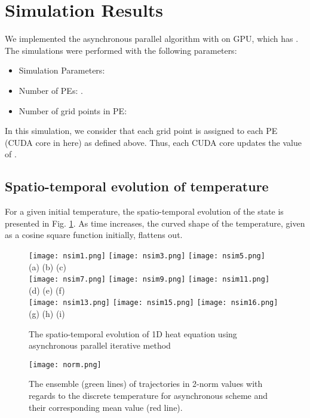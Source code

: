 \documentclass[1p]{elsarticle}
\begin{document}
\section{Simulation Results}
We implemented the asynchronous parallel algorithm with  on  GPU, which has  . 
The simulations were performed with the following parameters:
\begin{itemize}
\item{Simulation Parameters:}

\item{Number of PEs:} .
\item{Number of grid points in PE:} \\
\end{itemize}

In this simulation, we consider that each grid point is assigned to each PE (\textsf{CUDA} core in here) as defined  above. Thus, each \textsf{CUDA} core updates the value of .

\subsection{Spatio-temporal evolution of temperature}
For a given initial temperature, the spatio-temporal evolution of the state is presented in Fig. \ref{fig.2}. As time  increases, the curved shape of the temperature, given as a cosine square function initially, flattens out. 

\begin{figure}
\centering
\texttt{[image: nsim1.png]}
\texttt{[image: nsim3.png]}
\texttt{[image: nsim5.png]}\\
(a) \qquad\qquad\qquad\qquad\qquad\quad (b) \qquad\qquad\qquad\qquad\qquad\quad (c)\\
\texttt{[image: nsim7.png]}
\texttt{[image: nsim9.png]}
\texttt{[image: nsim11.png]}\\
(d) \qquad\qquad\qquad\qquad\qquad\quad (e) \qquad\qquad\qquad\qquad\qquad\quad (f)\\
\texttt{[image: nsim13.png]}
\texttt{[image: nsim15.png]}
\texttt{[image: nsim16.png]}\\
(g) \qquad\qquad\qquad\qquad\qquad\quad (h) \qquad\qquad\qquad\qquad\qquad\quad (i)\\
\caption{The spatio-temporal evolution of 1D heat equation using asynchronous parallel iterative method}\label{fig.2}
\vspace{0.2in}
\end{figure}
\begin{figure}
\centering
\texttt{[image: norm.png]}
\caption{The ensemble (green lines) of  trajectories in 2-norm values with regards to the discrete temperature  for asynchronous scheme and their corresponding mean value (red line).}\label{fig.3}
\end{figure}
\end{document}
